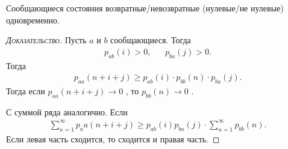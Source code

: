 \documentclass[../main.tex]{subfiles}
\begin{document}
\begin{thm}
 Сообщающиеся состояния возвратные/невозвратные (нулевые/не нулевые) одновременно.
\end{thm}
\begin{proof}[\normalfont\textsc{Доказательство}]
 Пусть $ a $ и $ b $ сообщающиеся. Тогда
 \begin{align*}
  p_{ab}(i) > 0, && p_{ba}(j) > 0.
 \end{align*} Тогда
 \begin{align*}
  p_{aa}(n+i+j) \geqslant p_{ab}(i) \cdot p_{bb}(n) \cdot p_{ba}(j).
 \end{align*} Тогда если $ p_{aa}(n+i+j) \to 0 $ , то $ p_{bb}(n) \to 0 $ .

 С суммой ряда аналогично. Если
 \begin{align*}
  \sum_{n=1}^{\infty} p_aa(n+i+j) \geqslant p_{ab}(i) p_{ba}(j) \cdot \sum_{n=1}^{\infty}p_{bb}(n).
 \end{align*} Если левая часть сходится, то сходится и правая часть.
\end{proof}
\end{document}
